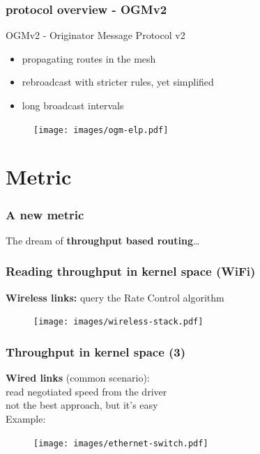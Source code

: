 \documentclass[slidestop]{beamer}
\begin{document}
\begin{frame}[c]
	\frametitle{protocol overview - OGMv2}

	OGMv2 - Originator Message Protocol v2
	\begin{itemize}
		\item propagating routes in the mesh
		\item rebroadcast with stricter rules, yet simplified
		\item long broadcast intervals
	\end{itemize}

	\begin{figure}
		\centering
		\texttt{[image: images/ogm-elp.pdf]}
	\end{figure}
\end{frame}

\section{Metric}
\begin{frame}[c]
	\frametitle{A new metric}
	\begin{center}
		The dream of \textbf{throughput based routing}\dots
	\end{center}
\end{frame}

\begin{frame}[c]
	\frametitle{Reading throughput in kernel space (WiFi)}
	\textbf{Wireless links:} query the Rate Control algorithm
	\vfill
	\begin{figure}
		\centering
		\texttt{[image: images/wireless-stack.pdf]}
	\end{figure}
\end{frame}


\begin{frame}[c]
	\frametitle{Throughput in kernel space (3)}
	\begin{center}
	\textbf{Wired links} (common scenario):\\
	read negotiated speed from the driver\\[0.5cm]
	\pause
	not the best approach, but it's easy\\[0.3cm]
	Example:
	\begin{figure}
		\centering
		\texttt{[image: images/ethernet-switch.pdf]}
	\end{figure}
	\end{center}
\end{frame}
\end{document}
